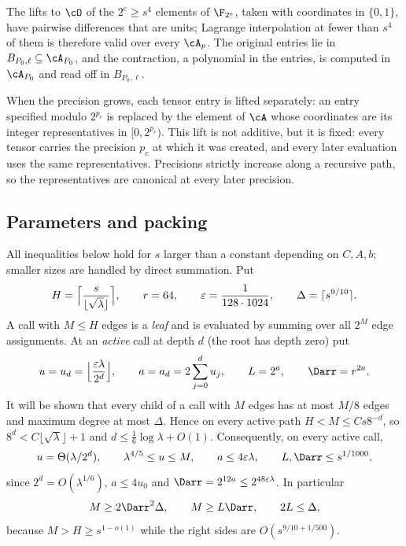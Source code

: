 The lifts to $\cO$ of the $2^e\ge s^4$ elements of $\F_{2^e}$, taken with
coordinates in $\{0,1\}$, have pairwise differences that are units; Lagrange
interpolation at fewer than $s^4$ of them is therefore valid over every
$\cA_p$. The original entries lie in $B_{P_0,\ell}\subseteq\cA_{P_0}$, and the
contraction, a polynomial in the entries, is computed in $\cA_{P_0}$ and read off
in $B_{P_0,\ell}$.

When the precision grows, each tensor entry is lifted separately: an entry
specified modulo $2^{p_c}$ is replaced by the element of $\cA$ whose coordinates
are its integer representatives in $[0,2^{p_c})$. This lift is not additive, but
it is fixed: every tensor carries the precision $p_c$ at which it was created,
and every later evaluation uses the same representatives. Precisions strictly
increase along a recursive path, so the representatives are canonical at every
later precision.

\subsection{Parameters and packing}\label{app:packing}
All inequalities below hold for $s$ larger than a constant depending on
$C,A,b$; smaller sizes are handled by direct summation. Put
\[
H=\Bigl\lceil\frac{s}{\lfloor\sqrt\lambda\rfloor}\Bigr\rceil,\qquad r=64,\qquad
\varepsilon=\frac1{128\cdot1024},\qquad\Delta=\lceil s^{9/10}\rceil.
\]
A call with $M\le H$ edges is a \emph{leaf} and is evaluated by summing over
all $2^M$ edge assignments. At an \emph{active} call at depth $d$ (the root has
depth zero) put
\begin{equation}\label{eq:params}
u=u_d=\Bigl\lfloor\frac{\varepsilon\lambda}{2^d}\Bigr\rfloor,\qquad
a=a_d=2\sum_{j=0}^du_j,\qquad L=2^a,\qquad \Darr=r^{2a}.
\end{equation}
It will be shown that every child of a call with $M$ edges has at most $M/8$
edges and maximum degree at most $\Delta$. Hence on every active path
$H<M\le Cs8^{-d}$, so $8^d<C\lfloor\sqrt\lambda\rfloor+1$ and
$d\le\frac16\log\lambda+O(1)$. Consequently, on every active call,
\begin{equation}\label{eq:inv1}
u=\Theta(\lambda/2^d),\qquad \lambda^{4/5}\le u\le M,\qquad a\le4\varepsilon\lambda,
\qquad L,\Darr\le s^{1/1000},
\end{equation}
since $2^d=O(\lambda^{1/6})$, $a\le4u_0$ and $\Darr=2^{12a}\le2^{48\varepsilon\lambda}$.
In particular
\begin{equation}\label{eq:inv2}
M\ge2\Darr^2\Delta,\qquad M\ge L\Darr,\qquad 2L\le\Delta,
\end{equation}
because $M>H\ge s^{1-o(1)}$ while the right sides are $O(s^{9/10+1/500})$.

